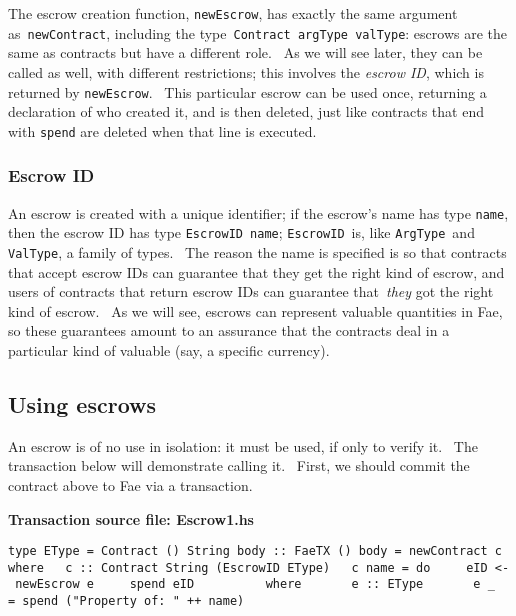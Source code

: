 \documentclass[11pt]{article}
\newcommand{\codeblock}[1]{\begin{mdframed}[
    backgroundcolor=header-color,
    linecolor=header-color,
    innertopmargin=10pt,
    ]{\texttt{#1}}\end{mdframed}}
\begin{document}
The escrow creation function, \texttt{newEscrow}, has exactly the same argument as \texttt{newContract}, including the type \texttt{Contract argType valType}: escrows are the same as contracts but have a different role.  As we will see later, they can be called as well, with different restrictions; this involves the \textit{escrow ID}, which is returned by \texttt{newEscrow}.  This particular escrow can be used once, returning a declaration of who created it, and is then deleted, just like contracts that end with \texttt{spend} are deleted when that line is executed.

\subsubsection{Escrow ID}
\vspace{5.5pt}

An escrow is created with a unique identifier; if the escrow's name has type \texttt{name}, then the escrow ID has type \texttt{EscrowID name}; \texttt{EscrowID} is, like \texttt{ArgType} and \texttt{ValType}, a family of types.  The reason the name is specified is so that contracts that accept escrow IDs can guarantee that they get the right kind of escrow, and users of contracts that return escrow IDs can guarantee that \textit{they} got the right kind of escrow.  As we will see, escrows can represent valuable quantities in Fae, so these guarantees amount to an assurance that the contracts deal in a particular kind of valuable (say, a specific currency).

\subsection{Using escrows}
\vspace{5.5pt}

An escrow is of no use in isolation: it must be used, if only to verify it.  The transaction below will demonstrate calling it.  First, we should commit the contract above to Fae via a transaction. 


\vspace{11pt}

\textbf{Transaction source file: Escrow1.hs}

\codeblock{type EType = Contract () String\newline
\newline
body :: FaeTX ()\newline
body = newContract c where\newline
  c :: Contract String (EscrowID EType)\newline
  c name = do\newline
    eID \textless{}- newEscrow e\newline
    spend eID\newline
    \newline
    where\newline
      e :: EType\newline
      e \_ = spend ("Property of: " ++ name)}
\end{document}
